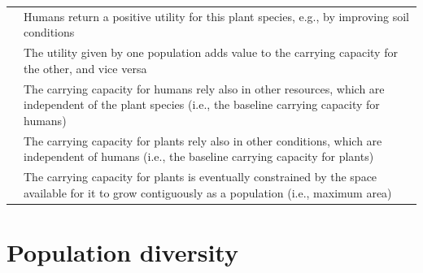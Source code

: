 \documentclass[
]{book}
\begin{document}
\begin{longtable}[]{@{}ll@{}}
\begin{minipage}[t]{0.45\columnwidth}
﻿\strut
\end{minipage} & \begin{minipage}[t]{0.49\columnwidth}\raggedright
Humans return a positive utility for this plant species, e.g., by improving soil conditions\strut
\end{minipage}\tabularnewline
\begin{minipage}[t]{0.45\columnwidth}\raggedright
﻿\strut
\end{minipage} & \begin{minipage}[t]{0.49\columnwidth}\raggedright
The utility given by one population adds value to the carrying capacity for the other, and vice versa\strut
\end{minipage}\tabularnewline
\begin{minipage}[t]{0.45\columnwidth}\raggedright
﻿\strut
\end{minipage} & \begin{minipage}[t]{0.49\columnwidth}\raggedright
The carrying capacity for humans rely also in other resources, which are independent of the plant species (i.e., the baseline carrying capacity for humans)\strut
\end{minipage}\tabularnewline
\begin{minipage}[t]{0.45\columnwidth}\raggedright
﻿\strut
\end{minipage} & \begin{minipage}[t]{0.49\columnwidth}\raggedright
The carrying capacity for plants rely also in other conditions, which are independent of humans (i.e., the baseline carrying capacity for plants)\strut
\end{minipage}\tabularnewline
\begin{minipage}[t]{0.45\columnwidth}\raggedright
﻿\strut
\end{minipage} & \begin{minipage}[t]{0.49\columnwidth}\raggedright
The carrying capacity for plants is eventually constrained by the space available for it to grow contiguously as a population (i.e., maximum area)\strut
\end{minipage}\tabularnewline
\bottomrule
\end{longtable}

\newpage

\hypertarget{population-diversity}{%
\section*{Population diversity}\label{population-diversity}}
\end{document}
